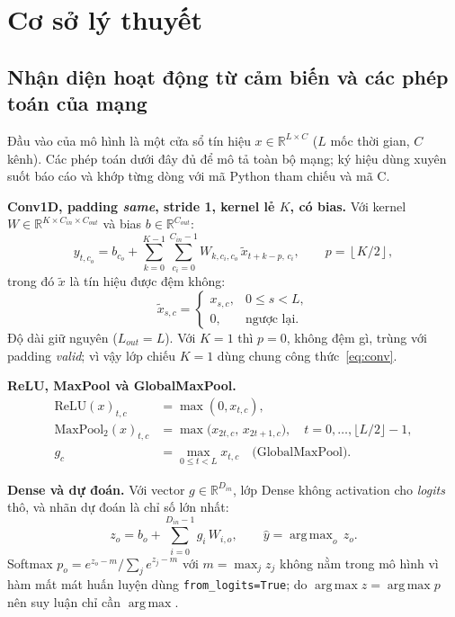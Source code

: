 \documentclass[12pt,a4paper]{article}
\newcommand{\code}[1]{\texttt{#1}}
\DeclareMathOperator*{\argmax}{arg\,max}
\begin{document}
\section{Cơ sở lý thuyết}

\subsection{Nhận diện hoạt động từ cảm biến và các phép toán của mạng}
Đầu vào của mô hình là một cửa sổ tín hiệu $x\in\mathbb{R}^{L\times C}$ ($L$ mốc thời gian, $C$ kênh). Các phép toán dưới đây đủ để mô tả toàn bộ mạng; ký hiệu dùng xuyên suốt báo cáo và khớp từng dòng với mã Python tham chiếu và mã C.

\textbf{Conv1D, padding \emph{same}, stride 1, kernel lẻ $K$, có bias.} Với kernel $W\in\mathbb{R}^{K\times C_{in}\times C_{out}}$ và bias $b\in\mathbb{R}^{C_{out}}$:
\begin{equation}
y_{t,c_o}=b_{c_o}+\sum_{k=0}^{K-1}\sum_{c_i=0}^{C_{in}-1}W_{k,c_i,c_o}\,\tilde{x}_{t+k-p,\,c_i},\qquad p=\left\lfloor K/2\right\rfloor,
\label{eq:conv}
\end{equation}
trong đó $\tilde{x}$ là tín hiệu được đệm không:
\begin{equation}
\tilde{x}_{s,c}=\begin{cases}x_{s,c}, & 0\le s<L,\\ 0, & \text{ngược lại.}\end{cases}
\label{eq:pad}
\end{equation}
Độ dài giữ nguyên ($L_{out}=L$). Với $K=1$ thì $p=0$, không đệm gì, trùng với padding \emph{valid}; vì vậy lớp chiếu $K=1$ dùng chung công thức~\eqref{eq:conv}.

\textbf{ReLU, MaxPool và GlobalMaxPool.}
\begin{align}
\mathrm{ReLU}(x)_{t,c}&=\max(0,x_{t,c}),\label{eq:relu}\\
\mathrm{MaxPool}_2(x)_{t,c}&=\max\bigl(x_{2t,c},\,x_{2t+1,c}\bigr),\quad t=0,\dots,\lfloor L/2\rfloor-1,\label{eq:pool}\\
g_c&=\max_{0\le t<L}x_{t,c}\quad\text{(GlobalMaxPool).}\label{eq:gmp}
\end{align}

\textbf{Dense và dự đoán.} Với vector $g\in\mathbb{R}^{D_{in}}$, lớp Dense không activation cho \emph{logits} thô, và nhãn dự đoán là chỉ số lớn nhất:
\begin{equation}
z_o=b_o+\sum_{i=0}^{D_{in}-1}g_i\,W_{i,o},\qquad \hat{y}=\argmax_{o}\,z_o .
\label{eq:dense}
\end{equation}
Softmax $p_o=e^{z_o-m}/\sum_j e^{z_j-m}$ với $m=\max_j z_j$ không nằm trong mô hình vì hàm mất mát huấn luyện dùng \code{from\_logits=True}; do $\argmax z=\argmax p$ nên suy luận chỉ cần $\argmax$.
\end{document}
